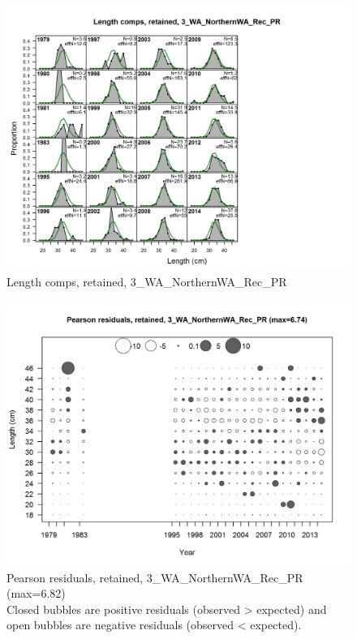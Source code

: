 \documentclass[12pt,]{article}
\begin{document}
\begin{figure}[htbp]
\centering
\includegraphics{./r4ss/plots_mod1/comp_lenfit_flt3mkt2.png}
\caption{Length comps, retained, 3\_WA\_NorthernWA\_Rec\_PR
\label{fig:mod1_5_comp_lenfit_flt3mkt2}}
\end{figure}

\begin{figure}[htbp]
\centering
\includegraphics{./r4ss/plots_mod1/comp_lenfit_residsflt3mkt2.png}
\caption{Pearson residuals, retained, 3\_WA\_NorthernWA\_Rec\_PR
(max=6.82)\\
Closed bubbles are positive residuals (observed \textgreater{} expected)
and open bubbles are negative residuals (observed \textless{} expected).
\label{fig:mod1_6_comp_lenfit_residsflt3mkt2}}
\end{figure}
\end{document}
